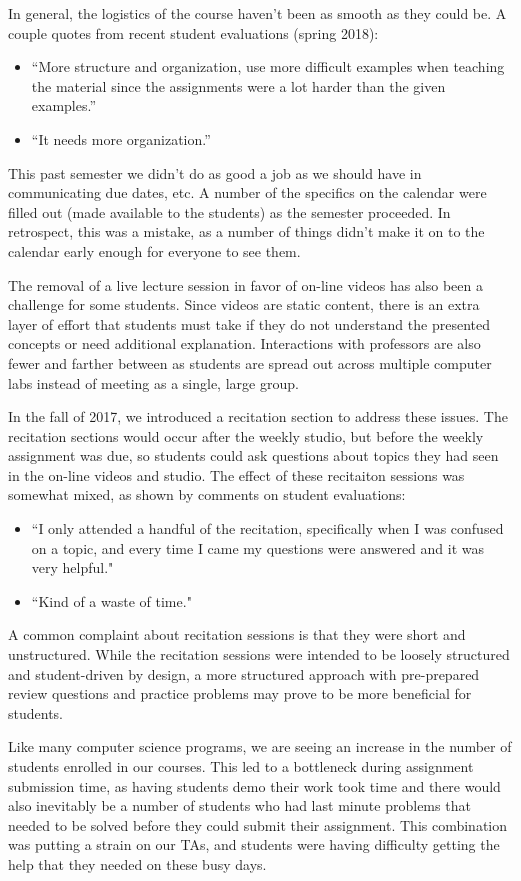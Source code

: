 In general, the logistics of the course haven't been as smooth as they could be.
A couple quotes from recent student evaluations (spring 2018):
\begin{itemize}
\item ``More structure and organization, use more difficult examples when
teaching the material since the assignments were a lot harder than
the given examples.''
\item ``It needs more organization.''
\end{itemize}
This past semester we didn't do as good a job as we should have
in communicating due dates, etc. A number of the specifics on the calendar
were filled out (made available to the students) as the semester proceeded.
In retrospect, this was a mistake, as a number of things didn't make it on
to the calendar early enough for everyone to see them.

The removal of a live lecture session in favor of on-line videos has also been
a challenge for some students. Since videos are static content, there is an
extra layer of effort that students must take if they do not understand the
presented concepts or need additional explanation. Interactions with professors
are also fewer and farther between as students are spread out across multiple
computer labs instead of meeting as a single, large group.

In the fall of 2017, we introduced a recitation section to address these issues.
The recitation sections would occur after the weekly studio, but before the weekly
assignment was due, so students could ask questions about topics they had
seen in the on-line videos and studio. The effect of these recitaiton sessions
was somewhat mixed, as shown by comments on student evaluations:
\begin{itemize}
\item ``I only attended a handful of the recitation, specifically when I was
confused on a topic, and every time I came my questions were answered and
it was very helpful."
\item ``Kind of a waste of time."
\end{itemize}

A common complaint about recitation sessions is that they were short and
unstructured. While the recitation sessions were intended to be loosely
structured and student-driven by design, a more structured approach with
pre-prepared review questions and practice problems may prove to be
more beneficial for students.

Like many computer science programs, we are seeing an increase in
the number of students enrolled in our courses. This led to a bottleneck
during assignment submission time, as having students demo their work
took time and there would also inevitably be a number of students who had
last minute problems that needed to be solved before they could submit their
assignment. This combination was putting a strain on our TAs, and students
were having difficulty getting the help that they needed on these busy days.

